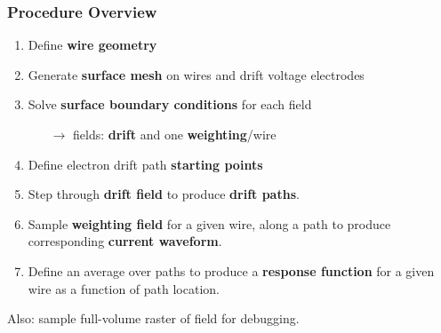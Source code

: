 \documentclass[xcolor=dvipsnames]{beamer}
\begin{document}
\begin{frame}
  \frametitle{Procedure Overview}
  \begin{enumerate}
  \item Define \textbf{wire geometry}
  \item Generate \textbf{surface mesh} on wires and drift voltage electrodes
  \item Solve \textbf{surface boundary conditions} for each field
    \begin{itemize}
    \item [$\rightarrow$] fields: \textbf{drift} and one \textbf{weighting}/wire
    \end{itemize}
  \item Define electron drift path \textbf{starting points}
  \item Step through \textbf{drift field} to produce \textbf{drift paths}.
  \item Sample \textbf{weighting field} for a given wire, along a path
    to produce corresponding \textbf{current waveform}.
  \item Define an average over paths to produce a \textbf{response
      function} for a given wire as a function of path location.
  \end{enumerate}
  Also: sample full-volume raster of field for debugging.
\end{frame}
\end{document}
